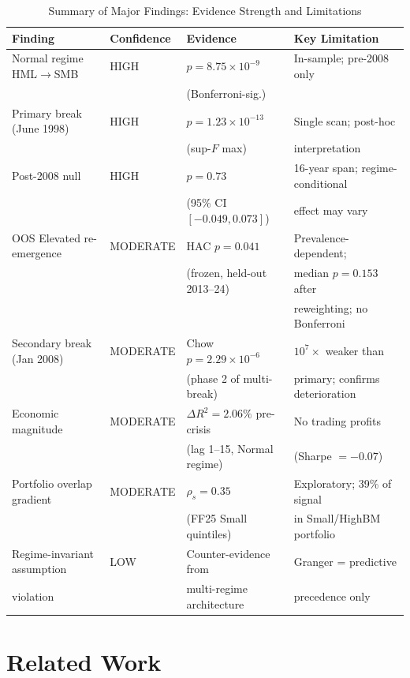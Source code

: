 \documentclass[sigconf,anonymous]{acmart}
\begin{document}
\begin{table}[t]
\centering
\caption[Key Findings Summary]{Summary of Major Findings: Evidence Strength and Limitations}
\label{tab:key_findings}
\small
\setlength{\tabcolsep}{5pt}
\begin{tabular}{@{}llll@{}}
\toprule
\textbf{Finding} & \textbf{Confidence} & \textbf{Evidence} & \textbf{Key Limitation} \\
\midrule
Normal regime HML$\to$SMB & HIGH & $p = 8.75 \times 10^{-9}$ & In-sample; pre-2008 only \\
& & (Bonferroni-sig.) & \\
Primary break (June 1998) & HIGH & $p = 1.23 \times 10^{-13}$ & Single scan; post-hoc \\
& & (sup-$F$ max) & interpretation \\
Post-2008 null & HIGH & $p = 0.73$ & 16-year span; regime-conditional \\
& & (95\% CI $[-0.049, 0.073]$) & effect may vary \\
OOS Elevated re-emergence & MODERATE & HAC $p = 0.041$ & Prevalence-dependent; \\
& & (frozen, held-out 2013--24) & median $p = 0.153$ after \\
& & & reweighting; no Bonferroni \\
Secondary break (Jan 2008) & MODERATE & Chow $p = 2.29 \times 10^{-6}$ & $10^{7}\times$ weaker than \\
& & (phase 2 of multi-break) & primary; confirms deterioration \\
Economic magnitude & MODERATE & $\Delta R^2 = 2.06\%$ pre-crisis & No trading profits \\
& & (lag 1--15, Normal regime) & (Sharpe $= -0.07$) \\
Portfolio overlap gradient & MODERATE & $\rho_s = 0.35$ & Exploratory; 39\% of signal \\
& & (FF25 Small quintiles) & in Small/HighBM portfolio \\
Regime-invariant assumption & LOW & Counter-evidence from & Granger = predictive \\
violation & & multi-regime architecture & precedence only \\
\bottomrule
\end{tabular}
\end{table}

\section{Related Work}
\end{document}

